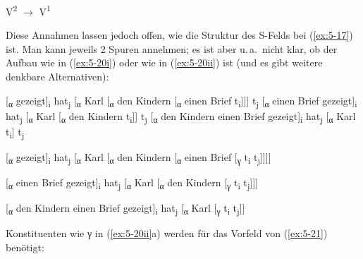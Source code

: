 \documentclass[output=paper]{LSP/langsci}
\begin{document}
\begin{exe}
\ex%
\label{ex:5-19}
V\textsuperscript{2} ${\rightarrow}$ V\textsuperscript{1}
\end{exe}
Diese Annahmen lassen jedoch offen, wie die Struktur des S-Felds bei (\ref{ex:5-17}) ist. Man kann jeweils 2 Spuren annehmen; es ist aber u.\,a.\ nicht klar, ob der Aufbau wie in (\ref{ex:5-20i}) oder wie in (\ref{ex:5-20ii}) ist (und es gibt weitere denkbare Alternativen):
\begin{exe}
\ex%
\label{ex:5-20}
\begin{xlisti}
\ex%
\label{ex:5-20i}
\begin{xlista}
\ex%
\label{ex:5-20ia}
[\textsubscript{α} gezeigt]\textsubscript{i}
hat\textsubscript{j} [\textsubscript{α}
Karl [\textsubscript{α} den Kindern
[\textsubscript{α} einen Brief
t\textsubscript{i}]]] t\textsubscript{j}
\ex%
\label{ex:5-20ib}
[\textsubscript{α} einen Brief
  gezeigt]\textsubscript{i} hat\textsubscript{j}
[\textsubscript{α} Karl [\textsubscript{α}
den Kindern t\textsubscript{i}]]
t\textsubscript{j}
\ex%
\label{ex:5-20ic}
[\textsubscript{α} den Kindern einen Brief
  gezeigt]\textsubscript{i} hat\textsubscript{j}
[\textsubscript{α} Karl t\textsubscript{i}]
t\textsubscript{j}
\end{xlista}

\ex%
\label{ex:5-20ii}
\begin{xlista}
\ex%
{\label{ex:5-20iia}
[\textsubscript{α} gezeigt]\textsubscript{i}
hat\textsubscript{j} [\textsubscript{α}
Karl [\textsubscript{α} den Kindern
[\textsubscript{α} einen Brief
[\textsubscript{γ} t\textsubscript{i}
t\textsubscript{j}]]]]}

\ex%
\label{ex:5-20iib}
[\textsubscript{α} einen Brief
  gezeigt]\textsubscript{i} hat\textsubscript{j}
[\textsubscript{α} Karl [\textsubscript{α}
den Kindern [\textsubscript{γ}
t\textsubscript{i} t\textsubscript{j}]]]

\ex%
\label{ex:5-20iic}
[\textsubscript{α} den Kindern einen Brief
  gezeigt]\textsubscript{i} hat\textsubscript{j}
[\textsubscript{α} Karl [\textsubscript{γ}
t\textsubscript{i} t\textsubscript{j}]]
\end{xlista}
\end{xlisti}
\end{exe}
Konstituenten wie γ in (\ref{ex:5-20ii}a) werden \zb für das Vorfeld von (\ref{ex:5-21}) benötigt:
\end{document}
